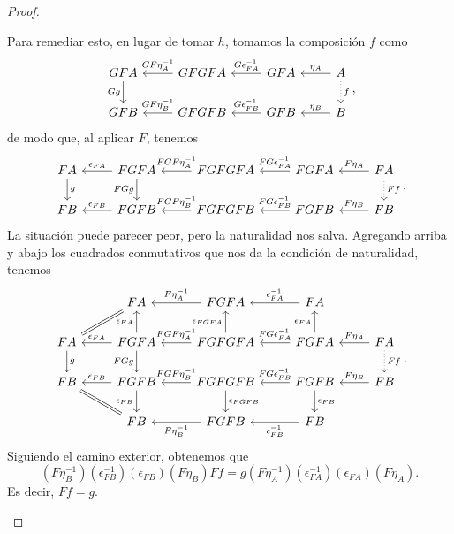 \begin{proof}
\begin{itemize}
        Para remediar esto, en lugar de tomar $h$, tomamos la composición
        $f$ como
        \[
        \begin{tikzcd}
            GFA \ar[d,"Gg"']
            & GFGFA \ar[l,"GF\eta_A^{-1}"']
            & GFA \ar[l,"G\epsilon_{FA}^{-1}"']
            & A \ar[l,"\eta_A"']
            \ar[d,"f",dotted]\\
            GFB
            & GFGFB \ar[l,"GF\eta_B^{-1}"']
            & GFB \ar[l,"G\epsilon_{FB}^{-1}"']
            & B \ar[l,"\eta_B"']
        \end{tikzcd}
        ,\]
        de modo que, al aplicar $F$, tenemos
        \[
        \begin{tikzcd}
            FA \ar[d,"g"]
            & FGFA \ar[d,"FGg"'] \ar[l,"\epsilon_{FA}"']
            & FGFGFA \ar[l,"FGF\eta_A^{-1}"']
            & FGFA \ar[l,"FG\epsilon_{FA}^{-1}"']
            & FA \ar[l,"F\eta_A"']
            \ar[d,"Ff",dotted]\\
            FB
            & FGFB \ar[l,"\epsilon_{FB}"']
            & FGFGFB \ar[l,"FGF\eta_B^{-1}"']
            & FGFB \ar[l,"FG\epsilon_{FB}^{-1}"']
            & FB \ar[l,"F\eta_B"']
        \end{tikzcd}
        .\]
        La situación puede parecer peor, pero la naturalidad nos salva.
        Agregando arriba y abajo los cuadrados conmutativos que nos
        da la condición de naturalidad, tenemos
        \[
        \begin{tikzcd}
            & FA \ar[equal,dl]
            & FGFA \ar[l,"F\eta_A^{-1}"']
            & FA \ar[l,"\epsilon_{FA}^{-1}"']
            \\
            FA \ar[d,"g"]
            & FGFA \ar[d,"FGg"'] \ar[u,"\epsilon_{FA}"]\ar[l,"\epsilon_{FA}"']
            & FGFGFA \ar[l,"FGF\eta_A^{-1}"'] \ar[u,"\epsilon_{FGFA}"]
            & FGFA \ar[l,"FG\epsilon_{FA}^{-1}"'] \ar[u,"\epsilon_{FA}"]
            & FA \ar[l,"F\eta_A"']
            \ar[d,"Ff",dotted]
            \\
            FB
            & FGFB \ar[l,"\epsilon_{FB}"']\ar[d,"\epsilon_{FB}"']
            & FGFGFB \ar[l,"FGF\eta_B^{-1}"'] \ar[d,"\epsilon_{FGFB}"]
            & FGFB \ar[l,"FG\epsilon_{FB}^{-1}"'] \ar[d,"\epsilon_{FB}"]
            & FB \ar[l,"F\eta_B"']
            \\
            & FB \ar[equal,ul]
            & FGFB \ar[l,"F\eta_B^{-1}"]
            & FB \ar[l,"\epsilon_{FB}^{-1}"]
        \end{tikzcd}
        .\]
        Siguiendo el camino exterior, obtenemos que
        \[
            (F\eta_B^{-1})(\epsilon_{FB}^{-1})(\epsilon_{FB})(F\eta_B)Ff
            = g(F\eta_A^{-1})(\epsilon_{FA}^{-1})(\epsilon_{FA})(F\eta_A)
        .\]
        Es decir, $Ff=g$.
        

\end{itemize}
\end{proof}
